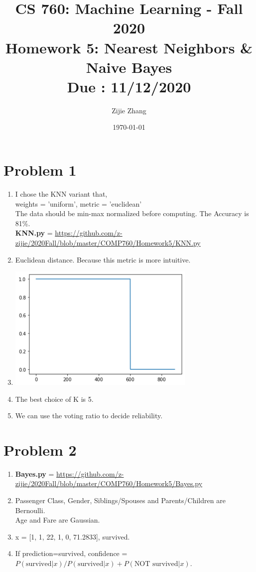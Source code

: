 \documentclass{article}
\title{CS 760: Machine Learning - Fall 2020\\
        {\Large \textbf{Homework 5: Nearest Neighbors \& Naive Bayes}}\\
        {\normalsize \textbf{Due : 11/12/2020}}
    }
\author{Zijie Zhang}
\date{\today}
\begin{document}
    \maketitle
    \section*{Problem 1}
    \begin{enumerate}[label=(\alph*)]
        \item I chose the KNN variant that,\\
            weights = 'uniform', metric = 'euclidean'\\
            The data should be min-max normalized before computing.
            The Accuracy is 81\%.\\
            \textbf{KNN.py} = \url{https://github.com/z-zijie/2020Fall/blob/master/COMP760/Homework5/KNN.py}
        \item Euclidean distance. Because this metric is more intuitive.
        \item \indent
        \begin{center}
            \includegraphics[width=9cm]{1c.png}
        \end{center}
        \item The best choice of K is 5.
        \item We can use the voting ratio to decide reliability.
    \end{enumerate}
    

    \section*{Problem 2}
    \begin{enumerate}[label=(\alph*)]
        \item \textbf{Bayes.py} = \url{https://github.com/z-zijie/2020Fall/blob/master/COMP760/Homework5/Bayes.py}
        \item Passenger Class, Gender, Siblings/Spouses and Parents/Children are Bernoulli.\\
        Age and Fare are Gaussian.
        \item x = [1, 1, 22, 1, 0, 71.2833], survived.
        \item If prediction=survived, confidence = $P(\text{survived}|x)/P(\text{survived}|x) + P(\text{NOT survived}|x)$.
    \end{enumerate}
\end{document}
